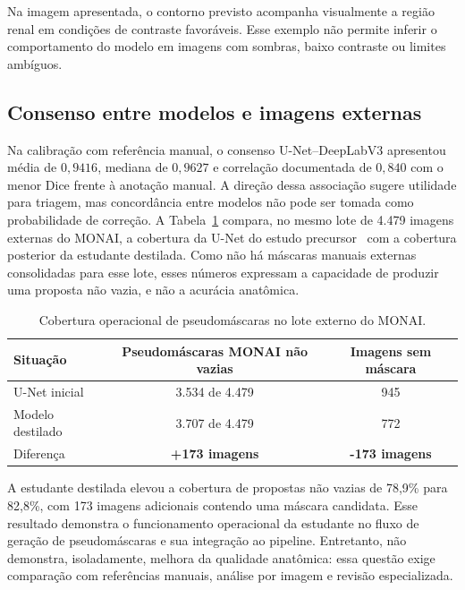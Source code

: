 \documentclass[12pt]{article}
\begin{document}
Na imagem apresentada, o contorno previsto acompanha visualmente a região renal em condições de contraste favoráveis. Esse exemplo não permite inferir o comportamento do modelo em imagens com sombras, baixo contraste ou limites ambíguos.


\subsection{Consenso entre modelos e imagens externas}

Na calibração com referência manual, o consenso U-Net--DeepLabV3 apresentou média de $0{,}9416$, mediana de $0{,}9627$ e correlação documentada de $0{,}840$ com o menor Dice frente à anotação manual. A direção dessa associação sugere utilidade para triagem, mas concordância entre modelos não pode ser tomada como probabilidade de correção. A Tabela~\ref{tab:pseudomascaras_monai} compara, no mesmo lote de 4.479 imagens externas do MONAI, a cobertura da U-Net do estudo precursor~\cite{Anjos2026SBBD} com a cobertura posterior da estudante destilada. Como não há máscaras manuais externas consolidadas para esse lote, esses números expressam a capacidade de produzir uma proposta não vazia, e não a acurácia anatômica.

\begin{table}[!htbp]
\centering
\caption[Cobertura de pseudomáscaras no MONAI]{Cobertura operacional de pseudomáscaras no lote externo do MONAI.}
\label{tab:pseudomascaras_monai}
\begin{tabular}{lcc}
\toprule
\textbf{Situação} & \textbf{Pseudomáscaras MONAI não vazias} & \textbf{Imagens sem máscara} \\
\midrule
U-Net inicial & 3.534 de 4.479 & 945 \\
Modelo destilado & 3.707 de 4.479 & 772 \\
Diferença & \textbf{+173 imagens} & \textbf{-173 imagens} \\
\bottomrule
\end{tabular}
\end{table}

A estudante destilada elevou a cobertura de propostas não vazias de 78,9\% para
82,8\%, com 173 imagens adicionais contendo uma máscara candidata. Esse resultado demonstra o funcionamento operacional da estudante
no fluxo de geração de pseudomáscaras e sua integração ao pipeline. Entretanto,
não demonstra, isoladamente, melhora da qualidade anatômica: essa questão exige
comparação com referências manuais, análise por imagem e revisão especializada.
\end{document}
